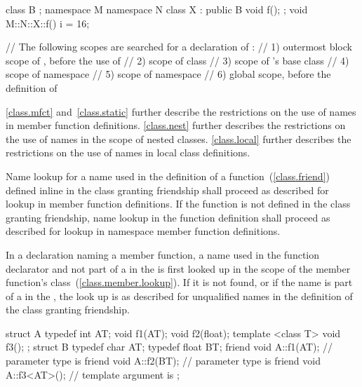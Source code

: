 \enterexample 
\begin{codeblock}
class B { };
namespace M {
  namespace N {
    class X : public B {
      void f();
    };
  }
}
void M::N::X::f() {
  i = 16;
}

// The following scopes are searched for a declaration of :
// 1) outermost block scope of , before the use of 
// 2) scope of class 
// 3) scope of 's base class 
// 4) scope of namespace 
// 5) scope of namespace 
// 6) global scope, before the definition of 
\end{codeblock}
\exitexample \enternote \ref{class.mfct} and~\ref{class.static} further
describe the restrictions on the use of names in member function
definitions. \ref{class.nest} further describes the restrictions on the
use of names in the scope of nested classes. \ref{class.local} further
describes the restrictions on the use of names in local class
definitions. \exitnote

\pnum
Name lookup for a name used in the definition of a 
function~(\ref{class.friend}) defined inline in the class granting
friendship shall proceed as described for lookup in member function
definitions. If the  function is not defined in the class
granting friendship, name lookup in the  function
definition shall proceed as described for lookup in namespace member
function definitions.

\pnum
In a  declaration naming a member function, a name used in
the function declarator and not part of a 
in the  is first looked up in the scope of the
member function's class~(\ref{class.member.lookup}). If it is not found,
or if the name is part of a
 in
the , the look up is
as described for unqualified names in the definition of the class
granting friendship. \enterexample

\begin{codeblock}
struct A {
  typedef int AT;
  void f1(AT);
  void f2(float);
  template <class T> void f3();
};
struct B {
  typedef char AT;
  typedef float BT;
  friend void A::f1(AT);      // parameter type is 
  friend void A::f2(BT);      // parameter type is 
  friend void A::f3<AT>();    // template argument is 
};
\end{codeblock}
\exitexample 

